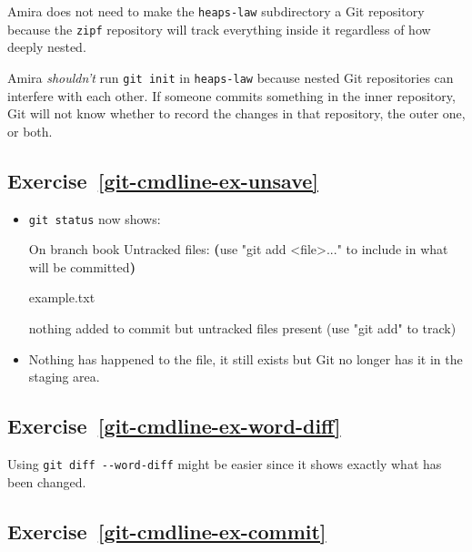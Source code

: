 \documentclass[
]{krantz}
\makeatletter
\newenvironment{Shaded}{\begin{snugshade}}{\end{snugshade}}
\newcommand{\ExtensionTok}[1]{#1}
\newcommand{\KeywordTok}[1]{\textcolor[rgb]{0.13,0.29,0.53}{\textbf{#1}}}
\newcommand{\NormalTok}[1]{#1}
\newcommand{\StringTok}[1]{\textcolor[rgb]{0.31,0.60,0.02}{#1}}
\newenvironment{kframe}{%
\medskip{}
\setlength{\fboxsep}{.8em}
 \def\at@end@of@kframe{}%
 \ifinner\ifhmode%
  \def\at@end@of@kframe{\end{minipage}}%
  \begin{minipage}{\columnwidth}%
 \fi\fi%
 \def\FrameCommand##1{\hskip\@totalleftmargin \hskip-\fboxsep
 \colorbox{shadecolor}{##1}\hskip-\fboxsep
     \hskip-\linewidth \hskip-\@totalleftmargin \hskip\columnwidth}%
 \MakeFramed {\advance\hsize-\width
   \@totalleftmargin\z@ \linewidth\hsize
   \@setminipage}}%
 {\par\unskip\endMakeFramed%
 \at@end@of@kframe}
\renewenvironment{Shaded}{\begin{kframe}}{\end{kframe}}
\makeatother
\begin{document}
Amira does not need to make the \texttt{heaps-law} subdirectory a Git repository
because the \texttt{zipf} repository will track everything inside it regardless of how deeply nested.

Amira \emph{shouldn't} run \texttt{git\ init} in \texttt{heaps-law} because nested Git repositories can interfere with each other.
If someone commits something in the inner repository,
Git will not know whether to record the changes in that repository,
the outer one,
or both.

\hypertarget{exercise-refgit-cmdline-ex-unsave}{%
\subsection*{Exercise~\ref{git-cmdline-ex-unsave}}\label{exercise-refgit-cmdline-ex-unsave}}


\begin{itemize}
\item
  \texttt{git\ status} now shows:

\begin{Shaded}
\begin{Highlighting}[]
\ExtensionTok{On}\NormalTok{ branch book}
\ExtensionTok{Untracked}\NormalTok{ files:}
  \KeywordTok{(}\ExtensionTok{use} \StringTok{"git add \textless{}file\textgreater{}..."}\NormalTok{ to include in what will be committed}\KeywordTok{)}

        \ExtensionTok{example.txt}

\ExtensionTok{nothing}\NormalTok{ added to commit but untracked files present (use }\StringTok{"git add"}\NormalTok{ to track)}
\end{Highlighting}
\end{Shaded}
\item
  Nothing has happened to the file, it still exists but Git no longer has it in
  the staging area.
\end{itemize}

\hypertarget{exercise-refgit-cmdline-ex-word-diff}{%
\subsection*{Exercise~\ref{git-cmdline-ex-word-diff}}\label{exercise-refgit-cmdline-ex-word-diff}}


Using \texttt{git\ diff\ -\/-word-diff} might be easier since it shows exactly what has been
changed.

\hypertarget{exercise-refgit-cmdline-ex-commit}{%
\subsection*{Exercise~\ref{git-cmdline-ex-commit}}\label{exercise-refgit-cmdline-ex-commit}}
\end{document}
